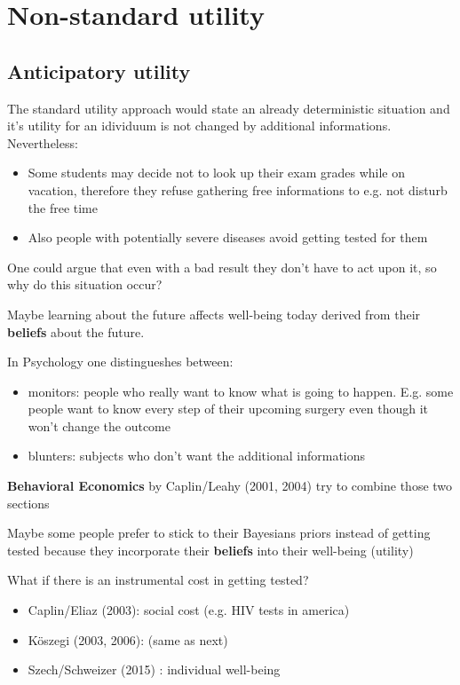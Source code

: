 
\chapter{Non-standard utility}


\section{Anticipatory utility}

The standard utility approach would state an already deterministic situation and it's utility for an idividuum is not changed by additional informations. Nevertheless:

\begin{itemize}
	\item Some students may decide not to look up their exam grades while on vacation, therefore they refuse gathering free informations to e.g. not disturb the free time
	\item Also people with potentially severe diseases avoid getting tested for them
\end{itemize}

One could argue that even with a bad result they don't have to act upon it, so why do this situation occur? 

Maybe learning about the future affects well-being today derived from their \textbf{beliefs} about the future.

In Psychology one distingueshes between:
\begin{itemize}
	\item monitors: people who really want to know what is going to happen. E.g. some people want to know every step of their upcoming surgery even though it won't change the outcome
	\item blunters: subjects who don't want the additional informations
\end{itemize}


\textbf{Behavioral Economics} by Caplin/Leahy (2001, 2004) try to combine those two sections

Maybe some people prefer to stick to their Bayesians priors instead of getting tested because they incorporate their \textbf{beliefs} into their well-being (utility)


What if there is an instrumental cost in getting tested?
\begin{itemize}
	\item Caplin/Eliaz (2003): social cost (e.g. HIV tests in america)
	\item Köszegi (2003, 2006): (same as next)
	\item Szech/Schweizer (2015) : individual well-being
\end{itemize}

